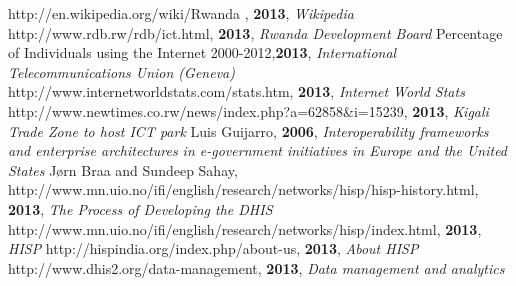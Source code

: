 \begin{thebibliography}{99}
http://en.wikipedia.org/wiki/Rwanda , {\bfseries 2013}, {\itshape Wikipedia}
http://www.rdb.rw/rdb/ict.html, {\bfseries 2013}, {\itshape Rwanda Development Board}
Percentage of Individuals using the Internet 2000-2012,{\bfseries 2013}, {\itshape International Telecommunications Union (Geneva)}
http://www.internetworldstats.com/stats.htm, {\bfseries 2013}, {\itshape Internet World Stats}
http://www.newtimes.co.rw/news/index.php?a=62858\&i=15239, {\bfseries 2013}, {\itshape Kigali Trade Zone to host ICT park}
Luis Guijarro, {\bfseries 2006}, {\itshape Interoperability frameworks and enterprise architectures in e-government initiatives in Europe and the United States}
Jørn Braa and Sundeep Sahay, http://www.mn.uio.no/ifi/english/research/networks/hisp/hisp-history.html, {\bfseries 2013}, {\itshape The Process of Developing the DHIS}
http://www.mn.uio.no/ifi/english/research/networks/hisp/index.html, {\bfseries 2013}, {\itshape HISP}
http://hispindia.org/index.php/about-us, {\bfseries 2013}, {\itshape About HISP}
http://www.dhis2.org/data-management, {\bfseries 2013}, {\itshape Data management and analytics}
\end{thebibliography}